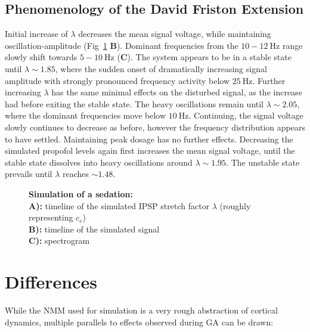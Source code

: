 \subsection{Phenomenology of the David Friston Extension}

    Initial increase of $\lambda$ decreases the mean signal voltage, while maintaining oscillation-amplitude
(Fig~\ref{fig:sedation_sim_df} \textbf{B}).
    Dominant frequencies from the $ 10-12 \SI{}{\hertz} $ range slowly shift towards
    $ 5-10 \SI{}{\hertz} $ (\textbf{C}).
    The system appears to be in a stable state until $ \lambda \sim 1.85 $,
    where the sudden onset of dramatically
    increasing signal amplitude with strongly pronounced frequency activity below $ \SI{25}{\hertz} $.
    Further increasing $\lambda$ has the same minimal effects on the disturbed signal,
    as the increase had before exiting the stable state.
    The heavy oscillations remain until $\lambda \sim 2.05 $,
    where the dominant frequencies move below $\SI{10}{\hertz}$.
    Continuing, the signal voltage slowly continues to decrease as before,
    however the frequency distribution appears to have settled.
    Maintaining peak dosage has no further effects.
    Decreasing the simulated propofol levels again first increases the mean signal voltage,
    until the stable state dissolves into heavy oscillations around $\lambda \sim 1.95$.
    The unstable state prevails until $\lambda$ reaches $\sim 1.48$.


\begin{figure}[H]
\toggletrue{drawLocRoc}
\def\simRunName{linear}

\caption{\textbf{Simulation of a sedation:} \\
        \textbf{A):} timeline of the simulated IPSP stretch factor $\lambda$ (roughly representing $c_e$) \\
        \textbf{B):} timeline of the simulated signal \\
        \textbf{C):} spectrogram
}\label{fig:sedation_sim_df}
\end{figure}

\section{Differences}
While the NMM used for simulation is a very rough abstraction of cortical dynamics,
multiple parallels to effects observed during GA can be drawn:

